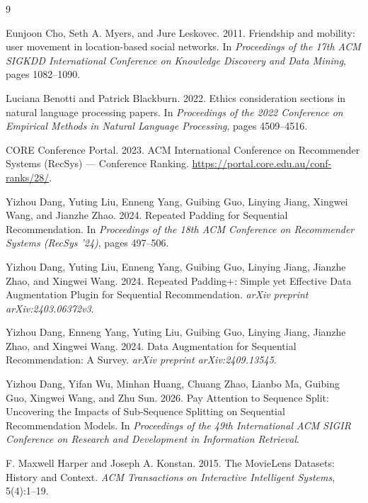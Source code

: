 \documentclass[11pt]{article}
\begin{document}

\begin{thebibliography}{9}

Eunjoon Cho, Seth A. Myers, and Jure Leskovec. 2011.
\newblock Friendship and mobility: user movement in location-based social networks.
\newblock In \emph{Proceedings of the 17th ACM SIGKDD International Conference on
Knowledge Discovery and Data Mining}, pages 1082--1090.

Luciana Benotti and Patrick Blackburn. 2022.
\newblock Ethics consideration sections in natural language processing papers.
\newblock In \emph{Proceedings of the 2022 Conference on Empirical Methods in Natural
Language Processing}, pages 4509--4516.

CORE Conference Portal. 2023.
\newblock ACM International Conference on Recommender Systems (RecSys) --- Conference
Ranking.
\newblock \url{https://portal.core.edu.au/conf-ranks/28/}.

Yizhou Dang, Yuting Liu, Enneng Yang, Guibing Guo, Linying Jiang, Xingwei Wang, and
Jianzhe Zhao. 2024.
\newblock Repeated Padding for Sequential Recommendation.
\newblock In \emph{Proceedings of the 18th ACM Conference on Recommender Systems (RecSys
'24)}, pages 497--506.

Yizhou Dang, Yuting Liu, Enneng Yang, Guibing Guo, Linying Jiang, Jianzhe Zhao, and
Xingwei Wang. 2024.
\newblock Repeated Padding+: Simple yet Effective Data Augmentation Plugin for Sequential
Recommendation.
\newblock \emph{arXiv preprint arXiv:2403.06372v3}.

Yizhou Dang, Enneng Yang, Yuting Liu, Guibing Guo, Linying Jiang, Jianzhe Zhao, and
Xingwei Wang. 2024.
\newblock Data Augmentation for Sequential Recommendation: A Survey.
\newblock \emph{arXiv preprint arXiv:2409.13545}.

Yizhou Dang, Yifan Wu, Minhan Huang, Chuang Zhao, Lianbo Ma, Guibing Guo, Xingwei Wang, and
Zhu Sun. 2026.
\newblock Pay Attention to Sequence Split: Uncovering the Impacts of Sub-Sequence
Splitting on Sequential Recommendation Models.
\newblock In \emph{Proceedings of the 49th International ACM SIGIR Conference on Research
and Development in Information Retrieval}.

F. Maxwell Harper and Joseph A. Konstan. 2015.
\newblock The MovieLens Datasets: History and Context.
\newblock \emph{ACM Transactions on Interactive Intelligent Systems}, 5(4):1--19.


\end{thebibliography}
\end{document}
